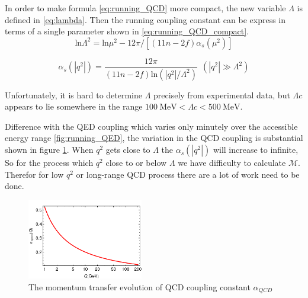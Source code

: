 In order to make formula \ref{eq:running_QCD} more compact, the new variable $\Lambda$ is defined in \ref{eq:lambda}. Then the running coupling constant can be express in terms of a single parameter shown in \ref{eq:running_QCD_compact}.
\begin{equation}
\mathrm{ln}\Lambda^{2}=\mathrm{ln}\mu^{2}-12\pi/[(11n-2f)\alpha_{s}(\mu^{2})]
\label{eq:lambda}
\end{equation}

\begin{equation}
\alpha_{s}(|q^{2}|)=\frac{12\pi}{(11n-2f)\mathrm{ln}(|q^{2}|/\Lambda^{2})}~~(|q^{2}|\gg\Lambda^{2})
\label{eq:running_QCD_compact}
\end{equation}

Unfortunately, it is hard to determine $\Lambda$ precisely from experimental data, but $\Lambda c$ appears to lie somewhere in the range $100~\mathrm{MeV}<\Lambda c<500~ \mathrm{MeV}$.

Difference with the QED coupling which varies only minutely over the accessible energy range \ref{fig:running_QED}, the variation in the QCD coupling is substantial shown in figure \ref{fig:QCD_running}. When $q^{2}$ gets close to $\Lambda$ the $\alpha_{s}(|q^{2}|)$ will increase to infinite, So for the process which $q^{2}$ close to or below $\Lambda$ we have difficulty to calculate $\mathcal{M}$. Therefor for low $q^{2}$ or long-range QCD process there are a lot of work need to be done.
\begin{figure}[h!]
 \begin{center}
\includegraphics[width=0.45\textwidth]{figures/theory/alphaQCD.png}
\caption{The momentum transfer evolution of QCD coupling constant $\alpha_{QCD}$ \cite{Roberts:2012sv}}
  \label{fig:QCD_running}
 \end{center}
\end{figure}
